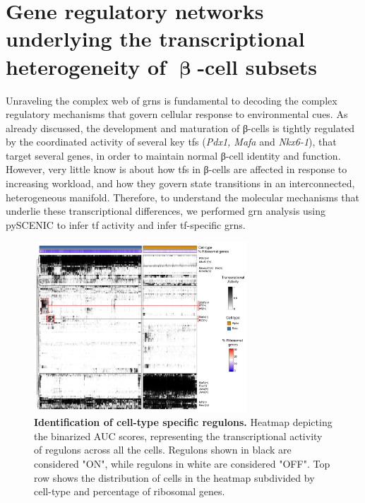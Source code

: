 \section{Gene regulatory networks underlying the transcriptional\\heterogeneity of \( \mathbf{\upbeta} \)-cell subsets}
\label{sec:chp3_betaGRN}
Unraveling the complex web of \glspl{grn} is fundamental to decoding the complex regulatory mechanisms that govern cellular response to environmental cues. As already discussed, the development and maturation of β-cells is tightly regulated by the coordinated activity of several key \glspl{tf} (\textit{Pdx1, Mafa} and \textit{Nkx6-1}), that target several genes, in order to maintain normal β-cell identity and function. However, very little know is about how \glspl{tf} in β-cells are affected in response to increasing workload, and how they govern state transitions in an interconnected, heterogeneous manifold. Therefore, to understand the molecular mechanisms that underlie these transcriptional differences, we performed \gls{grn} analysis using pySCENIC to infer \gls{tf} activity and infer \gls{tf}-specific \glspl{grn}.\\ %

\begin{figure}
\includegraphics[width=8cm]{Chapter5/Fig/F3-11-01.png}
\caption[Identification of cell-type specific regulons]{\textbf{Identification of cell-type specific regulons.} Heatmap depicting the binarized AUC scores, representing the transcriptional activity of regulons across all the cells. Regulons shown in black are considered "ON", while regulons in white are considered "OFF". Top row shows the distribution of cells in the heatmap subdivided by cell-type and percentage of ribosomal genes.}
\label{fig:chp3_scenic-1}
\end{figure}

